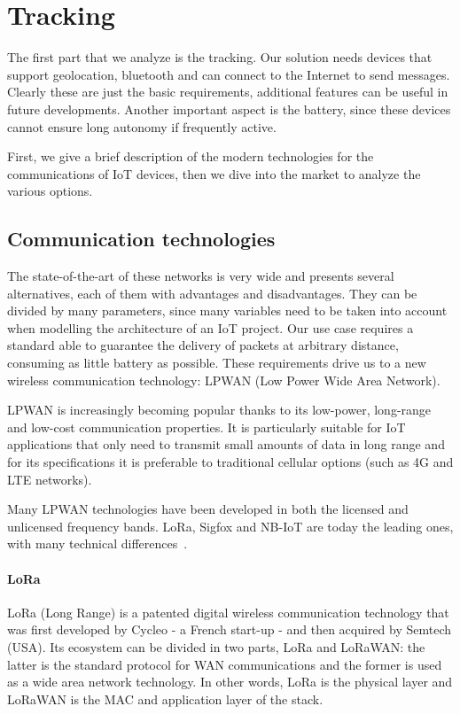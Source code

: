 \newpage
\chapter{Tracking}
\label{sec:tracking}

The first part that we analyze is the tracking. Our solution needs devices that support geolocation, bluetooth and can connect to the Internet to send messages. Clearly these are just the basic requirements, additional features can be useful in future developments. Another important aspect is the battery, since these devices cannot ensure long autonomy if frequently active. 

First, we give a brief description of the modern technologies for the communications of IoT devices, then we dive into the market to analyze the various options.

\section{Communication technologies}
\label{sec:track_comm}

The state-of-the-art of these networks is very wide and presents several alternatives, each of them with advantages and disadvantages. They can be divided by many parameters, since many variables need to be taken into account when modelling the architecture of an IoT project. Our use case requires a standard able to guarantee the delivery of packets at arbitrary distance, consuming as little battery as possible. These requirements drive us to a new wireless communication technology: LPWAN (Low Power Wide Area Network).

LPWAN is increasingly becoming popular thanks to its low-power, long-range and low-cost communication properties. It is particularly suitable for IoT applications that only need to transmit small amounts of data in long range and for its specifications it is preferable to traditional cellular options (such as 4G and LTE networks).

Many LPWAN technologies have been developed in both the licensed and unlicensed frequency bands. LoRa, Sigfox and NB-IoT are today the leading ones, with many technical differences~\cite{LPWAN_study}.

\subsubsection{LoRa}
LoRa (Long Range) is a patented digital wireless communication technology that was first developed by Cycleo - a French start-up - and then acquired by Semtech (USA). Its ecosystem can be divided in two parts, LoRa and LoRaWAN: the latter is the standard protocol for WAN communications and the former is used as a wide area network technology. In other words, LoRa is the physical layer and LoRaWAN is the MAC and application layer of the stack.

